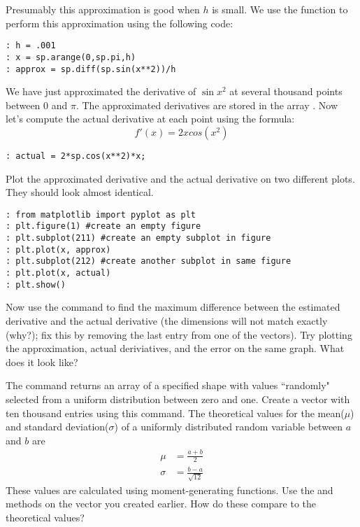 Presumably this approximation is good when $h$ is small. We use the 
function to perform this approximation using the following code:

\begin{lstlisting}
: h = .001
: x = sp.arange(0,sp.pi,h)
: approx = sp.diff(sp.sin(x**2))/h
\end{lstlisting}

We have just approximated the derivative of $\sin{x^2}$ at several thousand points between $0$ and $\pi$.  The approximated derivatives are stored in the array .  Now let's compute the actual derivative at each point using the formula:
\[
f'(x) = 2x cos(x^2)
\]
\begin{lstlisting}
: actual = 2*sp.cos(x**2)*x;
\end{lstlisting}

Plot the approximated derivative and the actual derivative on two different
plots.  They should look almost identical.
\begin{lstlisting}
: from matplotlib import pyplot as plt
: plt.figure(1) #create an empty figure
: plt.subplot(211) #create an empty subplot in figure
: plt.plot(x, approx)
: plt.subplot(212) #create another subplot in same figure
: plt.plot(x, actual)
: plt.show()
\end{lstlisting}

\begin{problem}
Now use the  command to find the maximum difference between the estimated derivative and the actual derivative
(the dimensions will not match exactly (why?);  fix this by removing
the last entry from one of the vectors).  Try plotting the approximation, actual deriviatives, and the error on the same graph.  What does it look like?
\end{problem}

\begin{problem}
The command  returns an array of a specified shape with values ``randomly" selected from a uniform distribution between zero and one. Create a  vector with ten thousand entries using this command. The theoretical values for the mean($\mu$)
and standard deviation($\sigma$) of a uniformly distributed random variable
between $a$ and $b$ are
\begin{align*}
\mu &= \frac{a+b}{2} \\
\sigma &= \frac{b-a}{\sqrt{12}}
\end{align*}
These values are calculated using moment-generating functions. Use the 
 and  methods on the vector you created earlier. How do these compare to the theoretical values?
\end{problem}


